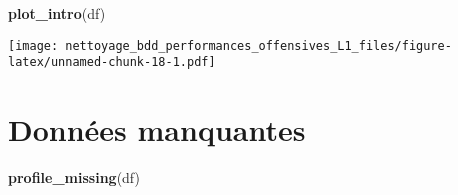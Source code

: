 \documentclass[7pt,]{report}
\newenvironment{Shaded}{\begin{snugshade}}{\end{snugshade}}
\newcommand{\KeywordTok}[1]{\textcolor[rgb]{0.13,0.29,0.53}{\textbf{#1}}}
\newcommand{\NormalTok}[1]{#1}
\begin{document}
\begin{Shaded}
\begin{Highlighting}[]
\KeywordTok{plot_intro}\NormalTok{(df)}
\end{Highlighting}
\end{Shaded}

\texttt{[image: nettoyage\_bdd\_performances\_offensives\_L1\_files/figure-latex/unnamed-chunk-18-1.pdf]}

\hypertarget{donnuxe9es-manquantes}{%
\section{Données manquantes}\label{donnuxe9es-manquantes}}

\begin{Shaded}
\begin{Highlighting}[]
\KeywordTok{profile_missing}\NormalTok{(df)}
\end{Highlighting}
\end{Shaded}
\end{document}
